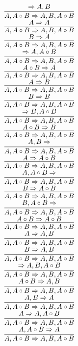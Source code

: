 \documentclass[11pt]{article}
\begin{document}
\begin{center}
\\$\infer{A, A\circ B\Rightarrow A, B, A\circ B}{\Rightarrow A, B}$
\bigskip
\\$\infer{A, A\circ B\Rightarrow A, B, A\circ B}{A\Rightarrow A}$
\bigskip
\\$\infer{A, A\circ B\Rightarrow A, B, A\circ B}{B\Rightarrow A}$
\bigskip
\\$\infer{A, A\circ B\Rightarrow A, B, A\circ B}{\Rightarrow A, A\circ B}$
\bigskip
\\$\infer{A, A\circ B\Rightarrow A, B, A\circ B}{A\circ B\Rightarrow A}$
\bigskip
\\$\infer{A, A\circ B\Rightarrow A, B, A\circ B}{A\Rightarrow B}$
\bigskip
\\$\infer{A, A\circ B\Rightarrow A, B, A\circ B}{B\Rightarrow B}$
\bigskip
\\$\infer{A, A\circ B\Rightarrow A, B, A\circ B}{\Rightarrow B, A\circ B}$
\bigskip
\\$\infer{A, A\circ B\Rightarrow A, B, A\circ B}{A\circ B\Rightarrow B}$
\bigskip
\\$\infer{A, A\circ B\Rightarrow A, B, A\circ B}{A, B\Rightarrow }$
\bigskip
\\$\infer{A, A\circ B\Rightarrow A, B, A\circ B}{A\Rightarrow A\circ B}$
\bigskip
\\$\infer{A, A\circ B\Rightarrow A, B, A\circ B}{A, A\circ B\Rightarrow }$
\bigskip
\\$\infer{A, A\circ B\Rightarrow A, B, A\circ B}{B\Rightarrow A\circ B}$
\bigskip
\\$\infer{A, A\circ B\Rightarrow A, B, A\circ B}{B, A\circ B\Rightarrow }$
\bigskip
\\$\infer{A, A\circ B\Rightarrow A, B, A\circ B}{A\circ B\Rightarrow A\circ B}$
\bigskip
\\$\infer{A, A\circ B\Rightarrow A, B, A\circ B}{A\Rightarrow A, B}$
\bigskip
\\$\infer{A, A\circ B\Rightarrow A, B, A\circ B}{B\Rightarrow A, B}$
\bigskip
\\$\infer{A, A\circ B\Rightarrow A, B, A\circ B}{\Rightarrow A, B, A\circ B}$
\bigskip
\\$\infer{A, A\circ B\Rightarrow A, B, A\circ B}{A\circ B\Rightarrow A, B}$
\bigskip
\\$\infer{A, A\circ B\Rightarrow A, B, A\circ B}{A, B\Rightarrow A}$
\bigskip
\\$\infer{A, A\circ B\Rightarrow A, B, A\circ B}{A\Rightarrow A, A\circ B}$
\bigskip
\\$\infer{A, A\circ B\Rightarrow A, B, A\circ B}{A, A\circ B\Rightarrow A}$

\end{center}
\end{document}
